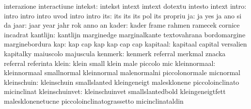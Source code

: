                            interazione               interactiune
                  intekst: intekst                   intext
                           imtext                    dotextu
                           intesto                   intext
                    intro: intro                     intro
                           intro                     uvod
                           intro                     intro
                      its: its                       its
                           its                       pol
                           its                       propriu %
                       ja: ja                        yes
                           ja                        ano
                           si                        da
                     jaar: jaar                      year
                           jahr                      rok
                           anno                      an
                    kader: kader                     frame
                           rahmen                    ramecek
                           cornice                   incadrat
                 kantlijn: kantlijn                  marginedge
                           marginalkante             textovahrana
                           bordomargine              marginebordura
                      kap: kap                       cap
                           kap                       kap
                           cap                       cap
                 kapitaal: kapitaal                  capital
                           versalien                 kapitalky
                           maiuscolo                 majuscula
                  kenmerk: kenmerk                   referral
                           merkmal                   znacka
                           referral                  referinta
                    klein: klein                     small
                           klein                     male
                           piccolo                   mic
             kleinnormaal: kleinnormaal              smallnormal
                           kleinnormal               malenormalni
                           piccolonormale            micnormal
              kleinschuin: kleinschuin               smallslanted
                           kleingeneigt              malesklonene
                           piccoloinclinato          micinclinat
           kleinschuinvet: kleinschuinvet            smallslantedbold
                           kleingeneigtfett          malesklonenetucne
                           piccoloinclinatograssetto micinclinataldin

